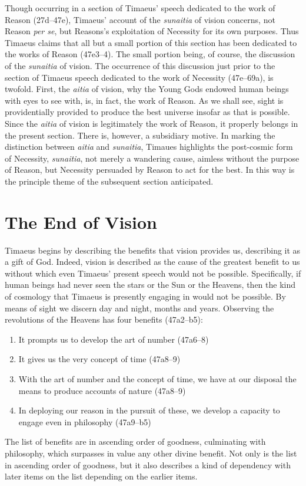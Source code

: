 Though occurring in a section of Timaeus' speech dedicated to the work of Reason (27d--47e), Timaeus' account of the \emph{sunaitia} of vision concerns, not Reason \emph{per se}, but Reasons's exploitation of Necessity for its own purposes. Thus Timaeus claims that all but a small portion of this section has been dedicated to the works of Reason (47e3--4). The small portion being, of course, the discussion of the \emph{sunaitia} of vision. The occurrence of this discussion just prior to the section of Timaeus speech dedicated to the work of Necessity (47e--69a), is twofold. First, the \emph{aitia} of vision, why the Young Gods endowed human beings with eyes to see with, is, in fact, the work of Reason. As we shall see, sight is providentially provided to produce the best universe insofar as that is possible. Since the \emph{aitia} of vision is legitimately the work of Reason, it properly belongs in the present section. There is, however, a subsidiary motive. In marking the distinction between \emph{aitia} and \emph{sunaitia}, Timaues highlights the post-cosmic form of Necessity, \emph{sunaitia}, not merely a wandering cause, aimless without the purpose of Reason, but Necessity persuaded by Reason to act for the best. In this way is the principle theme of the subsequent section anticipated.


\section{The End of Vision} %
\label{sec:the_end_of_sight}

Timaeus begins by describing the benefits that vision provides us, describing it as a gift of God. Indeed, vision is described as the cause of the greatest benefit to us without which even Timaeus' present speech would not be possible. Specifically, if human beings had never seen the stars or the Sun or the Heavens, then the kind of cosmology that Timaeus is presently engaging in would not be possible. By means of sight we discern day and night, months and years. Observing the revolutions of the Heavens has four benefits (47a2--b5):
\begin{enumerate}[(1)]
	\item It prompts us to develop the art of number (47a6--8)
	\item It gives us the very concept of time (47a8--9)
	\item With the art of number and the concept of time, we have at our disposal the means to produce accounts of nature (47a8--9)
	\item In deploying our reason in the pursuit of these, we develop a capacity to engage even in philosophy (47a9--b5)
\end{enumerate}
The list of benefits are in ascending order of goodness, culminating with philosophy, which surpasses in value any other divine benefit. Not only is the list in ascending order of goodness, but it also describes a kind of dependency with later items on the list depending on the earlier items.

